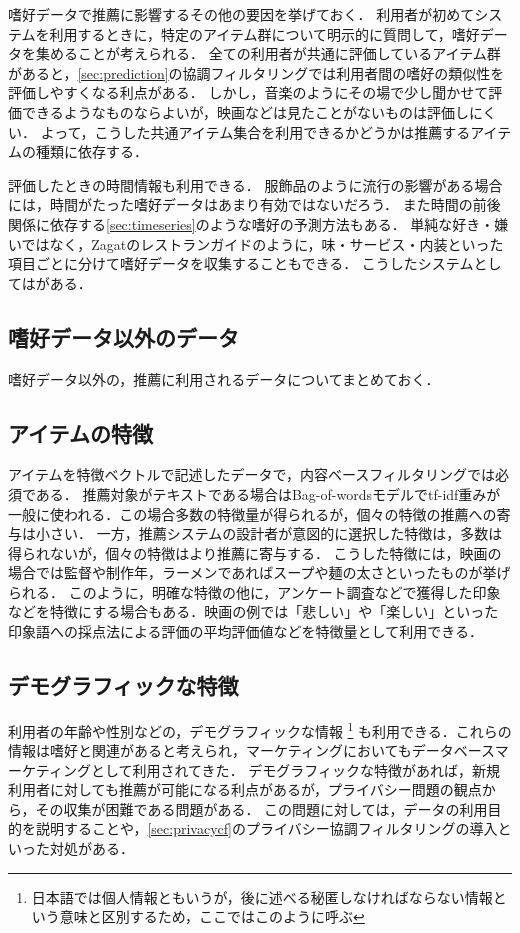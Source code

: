 嗜好データで推薦に影響するその他の要因を挙げておく．
利用者が初めてシステムを利用するときに，特定のアイテム群について明示的に質問して，嗜好データを集めることが考えられる．
全ての利用者が共通に評価しているアイテム群があると，\ref{sec:prediction}の協調フィルタリングでは利用者間の嗜好の類似性を評価しやすくなる利点がある．
しかし，音楽のようにその場で少し聞かせて評価できるようなものならよいが，映画などは見たことがないものは評価しにくい．
よって，こうした共通アイテム集合を利用できるかどうかは推薦するアイテムの種類に依存する．

評価したときの時間情報も利用できる．
服飾品のように流行の影響がある場合には，時間がたった嗜好データはあまり有効ではないだろう．
また時間の前後関係に依存する\ref{sec:timeseries}のような嗜好の予測方法もある．
単純な好き・嫌いではなく，Zagatのレストランガイドのように，味・サービス・内装といった項目ごとに分けて嗜好データを収集することもできる．
こうしたシステムとしては\cite{ieeem:07:02}がある．

\subsection{嗜好データ以外のデータ}
\label{sec:featuredata}

嗜好データ以外の，推薦に利用されるデータについてまとめておく．

\subsection{アイテムの特徴}

アイテムを特徴ベクトルで記述したデータで，内容ベースフィルタリングでは必須である．
推薦対象がテキストである場合はBag-of-wordsモデルでtf-idf重み\cite{jb:012:00}が一般に使われる．この場合多数の特徴量が得られるが，個々の特徴の推薦への寄与は小さい．
一方，推薦システムの設計者が意図的に選択した特徴は，多数は得られないが，個々の特徴はより推薦に寄与する．
こうした特徴には，映画の場合では監督や制作年，ラーメンであればスープや麺の太さといったものが挙げられる．
このように，明確な特徴の他に，アンケート調査などで獲得した印象などを特徴にする場合もある．映画の例では「悲しい」や「楽しい」といった印象語への採点法による評価の平均評価値などを特徴量として利用できる．

\subsection{デモグラフィックな特徴}

利用者の年齢や性別などの，デモグラフィックな情報%
\footnote{日本語では個人情報ともいうが，後に述べる秘匿しなければならない情報という意味と区別するため，ここではこのように呼ぶ}%
も利用できる\cite{ej:050}．これらの情報は嗜好と関連があると考えられ，マーケティングにおいてもデータベースマーケティングとして利用されてきた\cite{dmkd:01:01}．
デモグラフィックな特徴があれば，新規利用者に対しても推薦が可能になる利点があるが，プライバシー問題の観点から，その収集が困難である問題がある．
この問題に対しては，データの利用目的を説明すること\cite{sigir:01:01}や，\ref{sec:privacycf}のプライバシー協調フィルタリングの導入といった対処がある．

